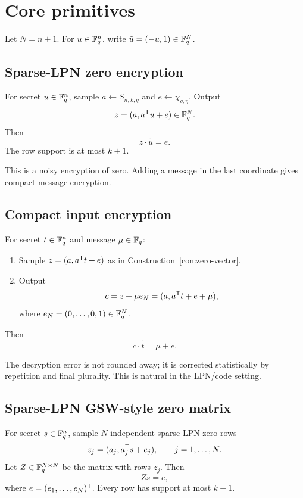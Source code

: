 \section{Core primitives}

Let $N=n+1$.  For $u\in\mathbb{F}_q^n$, write $\tilde{u}=(-u,1)\in\mathbb{F}_q^N$.

\subsection{Sparse-LPN zero encryption}

\begin{construction}
\label{con:zero-vector}
For secret $u\in\mathbb{F}_q^n$, sample $a\leftarrow S_{n,k,q}$ and $e\leftarrow\chi_{q,\eta}$.  Output
\[
    z=(a,a^{\mathsf T} u+e)\in\mathbb{F}_q^{N}.
\]
Then
\[
    z\cdot\tilde{u}=e.
\]
The row support is at most $k+1$.
\end{construction}

This is a noisy encryption of zero.  Adding a message in the last coordinate gives compact message encryption.

\subsection{Compact input encryption}

\begin{construction}
\label{con:input-enc}
For secret $t\in\mathbb{F}_q^n$ and message $\mu\in\mathbb{F}_q$:
\begin{enumerate}
    \item Sample $z=(a,a^{\mathsf T} t+e)$ as in Construction~\ref{con:zero-vector}.
    \item Output
    \[
        c=z+\mu e_N=(a,a^{\mathsf T} t+e+\mu),
    \]
    where $e_N=(0,\ldots,0,1)\in\mathbb{F}_q^N$.
\end{enumerate}
Then
\[
    c\cdot\tilde{t}=\mu+e.
\]
\end{construction}

The decryption error is not rounded away; it is corrected statistically by repetition and final plurality.  This is natural in the LPN/code setting.

\subsection{Sparse-LPN GSW-style zero matrix}

\begin{construction}
\label{con:gsw-zero}
For secret $s\in\mathbb{F}_q^n$, sample $N$ independent sparse-LPN zero rows
\[
    z_j=(a_j,a_j^{\mathsf T} s+e_j),\qquad j=1,\ldots,N.
\]
Let $Z\in\mathbb{F}_q^{N\times N}$ be the matrix with rows $z_j$.  Then
\[
    Z\tilde{s}=e,
\]
where $e=(e_1,\ldots,e_N)^{\mathsf T}$.  Every row has support at most $k+1$.
\end{construction}

